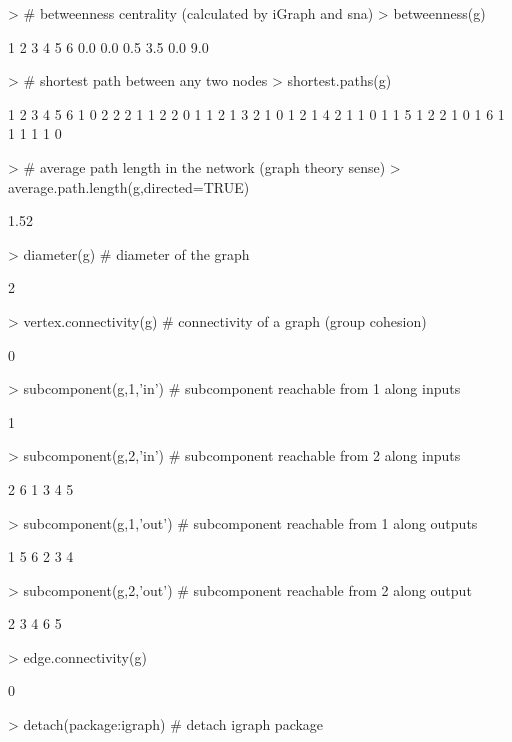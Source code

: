 \documentclass[article]{jss}
\begin{document}
\begin{Schunk}
\begin{Sinput}
> # betweenness centrality (calculated by iGraph and sna)
> betweenness(g)
\end{Sinput}
\begin{Soutput}
  1   2   3   4   5   6 
0.0 0.0 0.5 3.5 0.0 9.0 
\end{Soutput}
\begin{Sinput}
> # shortest path between any two nodes
> shortest.paths(g)
\end{Sinput}
\begin{Soutput}
  1 2 3 4 5 6
1 0 2 2 2 1 1
2 2 0 1 1 2 1
3 2 1 0 1 2 1
4 2 1 1 0 1 1
5 1 2 2 1 0 1
6 1 1 1 1 1 0
\end{Soutput}
\begin{Sinput}
> # average path length in the network (graph theory sense)
> average.path.length(g,directed=TRUE)
\end{Sinput}
\begin{Soutput}
[1] 1.52
\end{Soutput}
\begin{Sinput}
> diameter(g)  # diameter of the graph
\end{Sinput}
\begin{Soutput}
[1] 2
\end{Soutput}
\begin{Sinput}
> vertex.connectivity(g)  # connectivity of a graph (group cohesion)
\end{Sinput}
\begin{Soutput}
[1] 0
\end{Soutput}
\begin{Sinput}
> subcomponent(g,1,'in')  # subcomponent reachable from 1 along inputs
\end{Sinput}
\begin{Soutput}
[1] 1
\end{Soutput}
\begin{Sinput}
> subcomponent(g,2,'in')  # subcomponent reachable from 2 along inputs
\end{Sinput}
\begin{Soutput}
[1] 2 6 1 3 4 5
\end{Soutput}
\begin{Sinput}
> subcomponent(g,1,'out') # subcomponent reachable from 1 along outputs
\end{Sinput}
\begin{Soutput}
[1] 1 5 6 2 3 4
\end{Soutput}
\begin{Sinput}
> subcomponent(g,2,'out') # subcomponent reachable from 2 along output
\end{Sinput}
\begin{Soutput}
[1] 2 3 4 6 5
\end{Soutput}
\begin{Sinput}
> edge.connectivity(g)
\end{Sinput}
\begin{Soutput}
[1] 0
\end{Soutput}
\begin{Sinput}
> detach(package:igraph)  # detach igraph package
\end{Sinput}
\end{Schunk}
\end{document}
